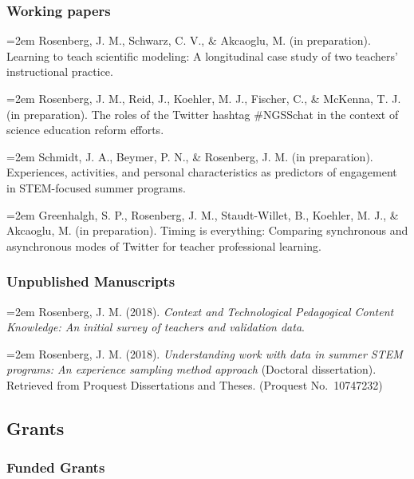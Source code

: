 \documentclass[14,]{article}
\begin{document}
\hypertarget{working-papers}{%
\subsubsection{Working papers}\label{working-papers}}

\hangindent=2em Rosenberg, J. M., Schwarz, C. V., \& Akcaoglu, M. (in
preparation). Learning to teach scientific modeling: A longitudinal case
study of two teachers' instructional practice.

\hangindent=2em Rosenberg, J. M., Reid, J., Koehler, M. J., Fischer, C.,
\& McKenna, T. J. (in preparation). The roles of the Twitter hashtag
\#NGSSchat in the context of science education reform efforts.

\hangindent=2em Schmidt, J. A., Beymer, P. N., \& Rosenberg, J. M. (in
preparation). Experiences, activities, and personal characteristics as
predictors of engagement in STEM-focused summer programs.

\hangindent=2em Greenhalgh, S. P., Rosenberg, J. M., Staudt-Willet, B.,
Koehler, M. J., \& Akcaoglu, M. (in preparation). Timing is everything:
Comparing synchronous and asynchronous modes of Twitter for teacher
professional learning.

\hypertarget{unpublished-manuscripts}{%
\subsubsection{Unpublished Manuscripts}\label{unpublished-manuscripts}}

\hangindent=2em Rosenberg, J. M. (2018). \emph{Context and Technological
Pedagogical Content Knowledge: An initial survey of teachers and
validation data}.

\hangindent=2em Rosenberg, J. M. (2018). \emph{Understanding work with
data in summer STEM programs: An experience sampling method approach}
(Doctoral dissertation). Retrieved from Proquest Dissertations and
Theses. (Proquest No.~10747232)

\hypertarget{grants}{%
\subsection{Grants}\label{grants}}

\hypertarget{funded-grants}{%
\subsubsection{Funded Grants}\label{funded-grants}}
\end{document}
